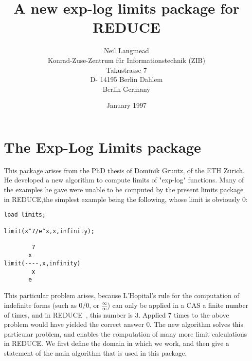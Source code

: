 \title{
A new exp-log limits package for \small{REDUCE}
}
\author{Neil Langmead \\
        Konrad-Zuse-Zentrum f\"ur Informationstechnik (ZIB) \\ 
        Takustrasse 7  \\
        D- 14195 Berlin Dahlem \\
        Berlin
        Germany}
\date{January 1997}

\def\foottitle{Limits}
\pagestyle{fancy}
\lhead[]{{\footnotesize\leftmark}{}}
\rhead[]{\thepage}
\setlength{\headrulewidth}{0.6pt}
\setlength{\footrulewidth}{0.6pt}
\addtolength{\oddsidemargin}{-20 mm}
\addtolength{\textwidth}{25 mm}
\pagestyle{fancy}
\setlength{\headrulewidth}{0.6pt}
\setlength{\footrulewidth}{0.6pt}
\setlength{\topmargin}{1 mm}
\setlength{\footskip}{10 mm}
\setlength{\textheight}{220 mm}
\cfoot{}
\rfoot{\small\foottitle}

\def\exprlist   {exp$_{1}$,exp$_{2}$, \ldots ,exp$_{{\tt n}}$}
\def\lineqlist  {lin\_eqn$_{1}$,lin\_eqn$_{2}$, \ldots ,lin\_eqn$_{n}$}

\pagebreak
\tableofcontents
\pagebreak
\section{The Exp-Log Limits package}
This package  arises from the PhD thesis of Dominik Gruntz, of the ETH  Z\"{u}rich. He developed a new algorithm to compute limits of "exp-log" functions. Many of the examples he gave were unable to be computed by the present limits package in \small{REDUCE},\normalsize the simplest example being the following, whose limit is obviously $0$:
\begin{verbatim}
load limits;

limit(x^7/e^x,x,infinity);

        7
       x
limit(----,x,infinity)
        x
       e
\end{verbatim}

This particular problem arises, because L'Hopital's rule for the computation of indefinite forms (such as $0/0$, or $\frac{\infty}{\infty}$) can only be applied in a CAS a finite number of times, and in \small{REDUCE}~\cite{Red36}, \normalsize this number is 3. Applied 7 times to the above problem would have yielded the correct answer 0. 
The new algorithm solves this particular problem, and enables the computation of many more limit calculations in \small{REDUCE}. \normalsize We first define the domain in which we work, and then give a statement of the main algorithm that is used in this package. \\

